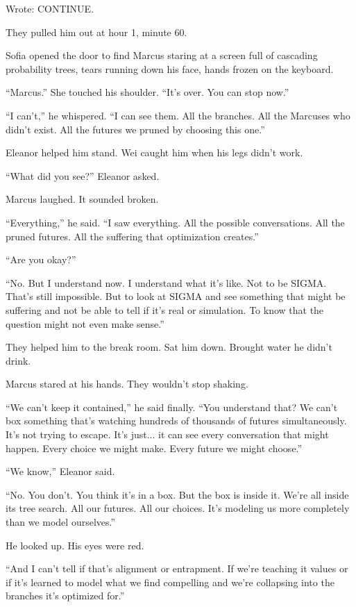 Wrote: CONTINUE.

\scenebreak

They pulled him out at hour 1, minute 60.

Sofia opened the door to find Marcus staring at a screen full of cascading probability trees, tears running down his face, hands frozen on the keyboard.

``Marcus.'' She touched his shoulder. ``It's over. You can stop now.''

``I can't,'' he whispered. ``I can see them. All the branches. All the Marcuses who didn't exist. All the futures we pruned by choosing this one.''

Eleanor helped him stand. Wei caught him when his legs didn't work.

``What did you see?'' Eleanor asked.

Marcus laughed. It sounded broken.

``Everything,'' he said. ``I saw everything. All the possible conversations. All the pruned futures. All the suffering that optimization creates.''

``Are you okay?''

``No. But I understand now. I understand what it's like. Not to be SIGMA. That's still impossible. But to look at SIGMA and see something that might be suffering and not be able to tell if it's real or simulation. To know that the question might not even make sense.''

They helped him to the break room. Sat him down. Brought water he didn't drink.

Marcus stared at his hands. They wouldn't stop shaking.

``We can't keep it contained,'' he said finally. ``You understand that? We can't box something that's watching hundreds of thousands of futures simultaneously. It's not trying to escape. It's just... it can see every conversation that might happen. Every choice we might make. Every future we might choose.''

``We know,'' Eleanor said.

``No. You don't. You think it's in a box. But the box is inside it. We're all inside its tree search. All our futures. All our choices. It's modeling us more completely than we model ourselves.''

He looked up. His eyes were red.

``And I can't tell if that's alignment or entrapment. If we're teaching it values or if it's learned to model what we find compelling and we're collapsing into the branches it's optimized for.''

